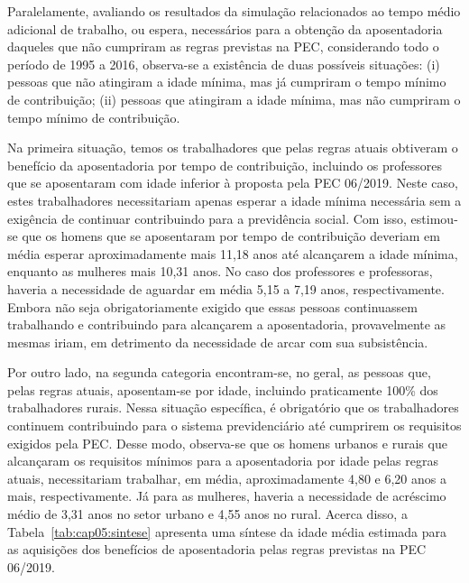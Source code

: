 Paralelamente, avaliando os resultados da simulação relacionados ao tempo médio adicional de trabalho, ou espera, necessários para a obtenção da aposentadoria daqueles que não cumpriram as regras previstas na PEC, considerando todo o período de 1995 a 2016, observa-se a existência de duas possíveis situações: (i) pessoas que não atingiram a idade mínima, mas já cumpriram o tempo mínimo de contribuição; (ii) pessoas que atingiram a idade mínima, mas não cumpriram o tempo mínimo de contribuição.

Na primeira situação, temos os trabalhadores que pelas regras atuais obtiveram o benefício da aposentadoria por tempo de contribuição, incluindo os professores que se aposentaram com idade inferior à proposta pela PEC 06/2019. Neste caso, estes trabalhadores necessitariam apenas esperar a idade mínima necessária sem a exigência de continuar contribuindo para a previdência social. Com isso, estimou-se que os homens que se aposentaram por tempo de contribuição deveriam em média esperar aproximadamente mais 11,18 anos até alcançarem a idade mínima, enquanto as mulheres mais 10,31 anos. No caso dos professores e professoras, haveria a necessidade de aguardar em média 5,15 a 7,19 anos, respectivamente. Embora não seja obrigatoriamente exigido que essas pessoas continuassem trabalhando e contribuindo para alcançarem a aposentadoria, provavelmente as mesmas iriam, em detrimento da necessidade de arcar com sua subsistência.

Por outro lado, na segunda categoria encontram-se, no geral, as pessoas que, pelas regras atuais, aposentam-se por idade, incluindo praticamente 100\% dos trabalhadores rurais. Nessa situação específica, é obrigatório que os trabalhadores continuem contribuindo para o sistema previdenciário até cumprirem os requisitos exigidos pela PEC. Desse modo, observa-se que os homens urbanos e rurais que alcançaram os requisitos mínimos para a aposentadoria por idade pelas regras atuais, necessitariam trabalhar, em média, aproximadamente 4,80 e 6,20 anos a mais, respectivamente. Já para as mulheres, haveria a necessidade de acréscimo médio de 3,31 anos no setor urbano e 4,55 anos no rural. Acerca disso, a Tabela~\ref{tab:cap05:sintese} apresenta uma síntese da idade média estimada para as aquisições dos benefícios de aposentadoria pelas regras previstas na PEC 06/2019.


